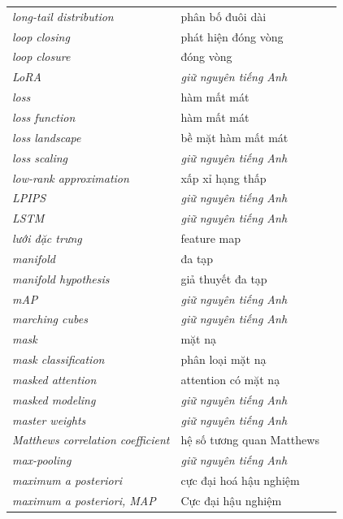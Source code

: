 \documentclass[deep_learning.tex]{subfiles}
\begin{document}
\begin{longtable}{@{}L{5.2cm}L{5.9cm}L{2.6cm}@{}}
\emph{long-tail distribution} & phân bố đuôi dài & \\
\emph{loop closing} & phát hiện đóng vòng & \\
\emph{loop closure} & đóng vòng & \\
\emph{LoRA} & \emph{\color{tiercol}giữ nguyên tiếng Anh} & \\
\emph{loss} & hàm mất mát & \\
\emph{loss function} & hàm mất mát & \\
\emph{loss landscape} & bề mặt hàm mất mát & \\
\emph{loss scaling} & \emph{\color{tiercol}giữ nguyên tiếng Anh} & \\
\emph{low-rank approximation} & xấp xỉ hạng thấp & \\
\emph{LPIPS} & \emph{\color{tiercol}giữ nguyên tiếng Anh} & \\
\emph{LSTM} & \emph{\color{tiercol}giữ nguyên tiếng Anh} & \\
\emph{lưới đặc trưng} & feature map & \\
\emph{manifold} & đa tạp & \\
\emph{manifold hypothesis} & giả thuyết đa tạp & \\
\emph{mAP} & \emph{\color{tiercol}giữ nguyên tiếng Anh} & \\
\emph{marching cubes} & \emph{\color{tiercol}giữ nguyên tiếng Anh} & \\
\emph{mask} & mặt nạ & \\
\emph{mask classification} & phân loại mặt nạ & \\
\emph{masked attention} & attention có mặt nạ & \\
\emph{masked modeling} & \emph{\color{tiercol}giữ nguyên tiếng Anh} & \\
\emph{master weights} & \emph{\color{tiercol}giữ nguyên tiếng Anh} & \\
\emph{Matthews correlation coefficient} & hệ số tương quan Matthews & \\
\emph{max-pooling} & \emph{\color{tiercol}giữ nguyên tiếng Anh} & \\
\emph{maximum a posteriori} & cực đại hoá hậu nghiệm & \\
\emph{maximum a posteriori, MAP} & Cực đại hậu nghiệm & \\

\end{longtable}
\end{document}

